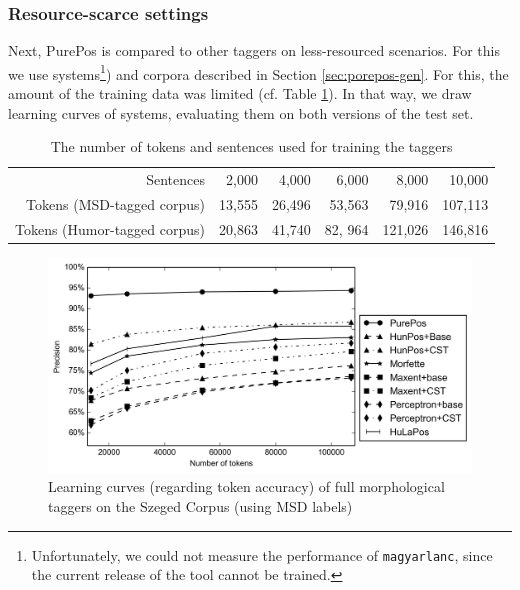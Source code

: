 \subsubsection{Resource-scarce settings}

Next, PurePos is compared to other taggers on less-resourced scenarios.
For this we use systems\footnote{Unfortunately, we could not measure the performance of \texttt{magyarlanc}, since the current release of the tool cannot be trained.})  and corpora described in Section \ref{sec:porepos-gen}.
For this, the amount of the training data was limited (cf. Table \ref{tab:small-szeged}).
In that way, we draw learning curves of systems, evaluating them on both versions of the test set.

\begin{table}[H]
\centering
\caption{The number of tokens and sentences used for training the taggers}
\label{tab:small-szeged}
\begin{tabular}{ r | r r r r r}
Sentences & 2,000 & 4,000 & 6,000 & 8,000 & 10,000 \\
Tokens (MSD-tagged corpus) & 13,555 & 26,496 & 53,563 & 79,916 & 107,113 \\
Tokens (Humor-tagged corpus) & 20,863 & 41,740 & 82, 964 & 121,026 & 146,816 \\
\end{tabular}
\end{table}


\begin{figure}[H]
  \centering
  \includegraphics[width=1\textwidth]{MorphTagging/msd_token.png} 
  \caption{Learning curves (regarding token accuracy) of full morphological taggers on the Szeged Corpus (using MSD labels)}
  \label{fig:msd-token}
\end{figure}

